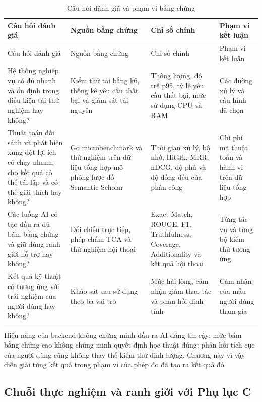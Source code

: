 \begin{longtable}{|>{\RaggedRight\arraybackslash}p{}|>{\RaggedRight\arraybackslash}p{}|>{\RaggedRight\arraybackslash}p{}|>{\RaggedRight\arraybackslash}p{}|}
  \caption{Câu hỏi đánh giá và phạm vi bằng chứng}\label{tab:ch4-demo-questions}\\[0.5\baselineskip]
  \hline
  Câu hỏi đánh giá & Nguồn bằng chứng & Chỉ số chính & Phạm vi kết luận \\ \hline
  \endfirsthead
  \hline
  Câu hỏi đánh giá & Nguồn bằng chứng & Chỉ số chính & Phạm vi kết luận \\ \hline
  \endhead
  \hline
  \endfoot
  Hệ thống nghiệp vụ có đủ nhanh và ổn định trong điều kiện tải thử nghiệm hay không? & Kiểm thử tải bằng k6, thống kê yêu cầu thất bại và giám sát tài nguyên & Thông lượng, độ trễ p95, tỷ lệ yêu cầu thất bại, mức sử dụng CPU và RAM & Các đường xử lý và cấu hình đã chọn \\ \hline
  Thuật toán đối sánh và phát hiện xung đột lợi ích có chạy nhanh, cho kết quả có thể tái lập và có thể giải thích hay không? & Go microbenchmark và thử nghiệm trên dữ liệu tổng hợp mô phỏng lược đồ Semantic Scholar & Thời gian xử lý, bộ nhớ, Hit@k, MRR, nDCG, độ phủ và độ đồng đều của phân công & Chi phí mã thuật toán và hành vi trên dữ liệu tổng hợp \\ \hline
  Các luồng AI có tạo đầu ra đủ bám bằng chứng và giữ đúng ranh giới hỗ trợ hay không? & Đối chiếu trực tiếp, phép chấm TCA và thử nghiệm hội thoại & Exact Match, ROUGE, F1, Truthfulness, Coverage, Additionality và kết quả hội thoại & Từng tác vụ và từng bộ kiểm thử tương ứng \\ \hline
  Kết quả kỹ thuật có tương ứng với trải nghiệm của người dùng hay không? & Khảo sát sau sử dụng theo ba vai trò & Mức hài lòng, cảm nhận giảm thao tác và phản hồi định tính & Cảm nhận của mẫu người dùng tham gia \\ \hline
\end{longtable}

Hiệu năng của backend không chứng minh đầu ra AI đáng tin cậy; mức bám bằng chứng cao không chứng minh quyết định học thuật đúng; phản hồi tích cực của người dùng cũng không thay thế kiểm thử định lượng. Chương này vì vậy diễn giải từng kết quả trong phạm vi của phép đo đã tạo ra kết quả đó.

\subsection{Chuỗi thực nghiệm và ranh giới với Phụ lục C}

